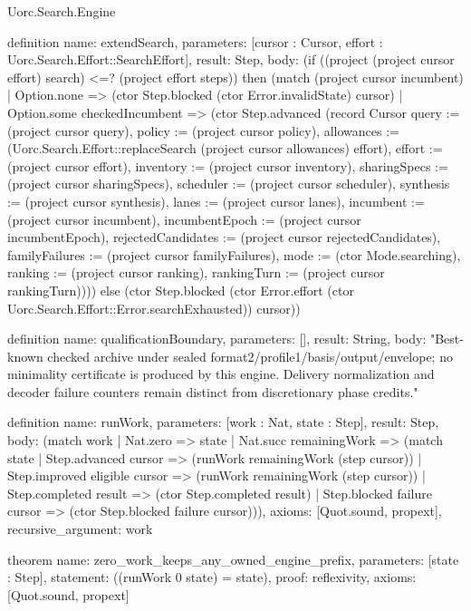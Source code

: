 \begin{lexlean}{Uorc.Search.Engine}
\begin{semanticmodule}
definition{
  name: extendSearch,
  parameters: [cursor : Cursor, effort : Uorc.Search.Effort::SearchEffort],
  result: Step,
  body: (if ((project (project cursor effort) search) <=? (project effort steps)) then (match (project cursor incumbent)
    | Option.none => (ctor Step.blocked (ctor Error.invalidState) cursor)
    | Option.some checkedIncumbent => (ctor Step.advanced (record Cursor {query := (project cursor query), policy := (project cursor policy), allowances := (Uorc.Search.Effort::replaceSearch (project cursor allowances) effort), effort := (project cursor effort), inventory := (project cursor inventory), sharingSpecs := (project cursor sharingSpecs), scheduler := (project cursor scheduler), synthesis := (project cursor synthesis), lanes := (project cursor lanes), incumbent := (project cursor incumbent), incumbentEpoch := (project cursor incumbentEpoch), rejectedCandidates := (project cursor rejectedCandidates), familyFailures := (project cursor familyFailures), mode := (ctor Mode.searching), ranking := (project cursor ranking), rankingTurn := (project cursor rankingTurn)}))) else (ctor Step.blocked (ctor Error.effort (ctor Uorc.Search.Effort::Error.searchExhausted)) cursor))
}

definition{
  name: qualificationBoundary,
  parameters: [],
  result: String,
  body: "Best-known checked archive under sealed format2/profile1/basis/output/envelope; no minimality certificate is produced by this engine. Delivery normalization and decoder failure counters remain distinct from discretionary phase credits."
}

definition{
  name: runWork,
  parameters: [work : Nat, state : Step],
  result: Step,
  body: (match work
    | Nat.zero => state
    | Nat.succ remainingWork => (match state
      | Step.advanced cursor => (runWork remainingWork (step cursor))
      | Step.improved eligible cursor => (runWork remainingWork (step cursor))
      | Step.completed result => (ctor Step.completed result)
      | Step.blocked failure cursor => (ctor Step.blocked failure cursor))),
  axioms: [Quot.sound, propext],
  recursive_argument: work
}

theorem{
  name: zero_work_keeps_any_owned_engine_prefix,
  parameters: [state : Step],
  statement: ((runWork 0 state) = state),
  proof: reflexivity{},
  axioms: [Quot.sound, propext]
}
\end{semanticmodule}
\end{lexlean}
